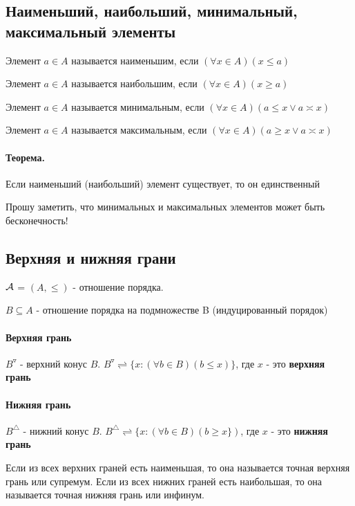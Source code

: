 \documentclass{report}
\begin{document}
\subsection{Наименьший, наибольший,\newline
    минимальный, максимальный элементы}
Элемент $a \in A$ называется наименьшим, если
$(\forall x \in A)(x \leq a)$

Элемент $a \in A$ называется наибольшим, если
$(\forall x \in A)(x \geq a)$


\medskip

Элемент $a \in A$ называется минимальным, если
$(\forall x \in A)(a \leq x \lor a \asymp x)$

Элемент $a \in A$ называется максимальным, если
$(\forall x \in A)(a \geq x \lor a \asymp x)$

\paragraph*{Теорема.}
Если наименьший (наибольший) элемент существует, то он единственный

\medskip

Прошу заметить, что минимальных и максимальных элементов может быть бесконечность!

\subsection{Верхняя и нижняя грани}
$\cal A$ = $(A, \leq)$ - отношение порядка.

$B \subseteq A$ - отношение порядка на подмножестве B (индуцированный порядок)

\paragraph*{Верхняя грань}
$B^{\triangledown}$ - верхний конус $B$.
$B^{\triangledown} \rightleftharpoons \{x: (\forall b \in B)(b \leq x)\}$, где $x$ - это \textbf{верхняя грань}

\paragraph*{Нижняя грань}
$B^{\triangle}$ - нижний конус $B$.
$B^{\triangle} \rightleftharpoons \{x: (\forall b \in B)(b \geq x\})$, где $x$ - это \textbf{нижняя грань}


Если из всех верхних граней есть наименьшая, то она называется точная верхняя грань или супремум.
Если из всех нижних граней есть наибольшая, то она называется точная нижняя грань или инфинум.
\end{document}
